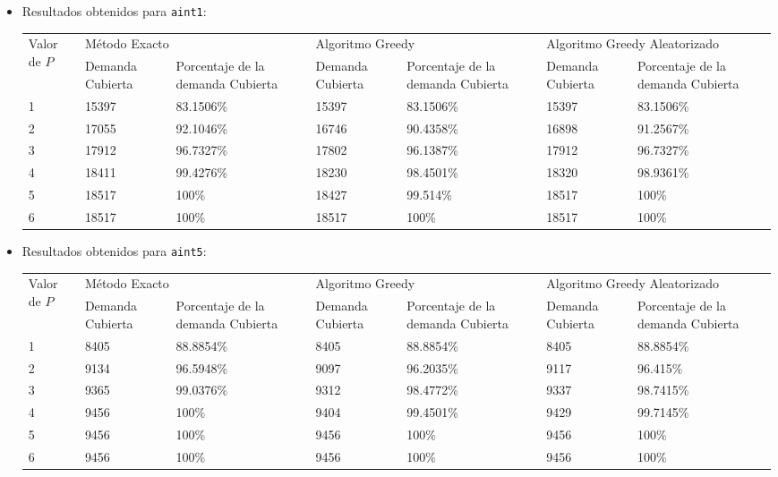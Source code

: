 \documentclass[a4paper,11pt]{article}
\begin{document}
\begin{itemize}
\item Resultados obtenidos para \texttt{aint1}:

\begin{table}[!htbp]
\label{results_aint1}
\centering
\begin{tabularx}{\textwidth}{|p{1.5cm}|p{1.5cm}|p{2cm}|p{1.5cm}|p{2cm}|p{1.5cm}|p{2cm}|}
\hline
\multirow{2}{\hsize}{Valor de ${P}$}	& \multicolumn{2}{X|}{Método Exacto}	& \multicolumn{2}{X|}{Algoritmo Greedy}	& \multicolumn{2}{X|}{Algoritmo Greedy Aleatorizado} \\ \cline{2-7}
& Demanda Cubierta  & Porcentaje de la demanda Cubierta	& Demanda Cubierta  & Porcentaje de la demanda Cubierta	& Demanda Cubierta  & Porcentaje de la demanda Cubierta	\\ \hline
1	& 15397	& 83.1506\%	& 15397	& 83.1506\%	& 15397	& 83.1506\%	\\ \hline
2	& 17055	& 92.1046\%	& 16746	& 90.4358\%	& 16898	& 91.2567\%	\\ \hline
3	& 17912	& 96.7327\%	& 17802	& 96.1387\%	& 17912	& 96.7327\%	\\ \hline
4	& 18411	& 99.4276\%	& 18230	& 98.4501\%	& 18320	& 98.9361\%	\\ \hline
5	& 18517	& 100\%		& 18427	& 99.514\%	& 18517	& 100\%		\\ \hline
6	& 18517	& 100\%		& 18517	& 100\%		& 18517	& 100\%		\\ \hline
\end{tabularx}
\end{table}

\item Resultados obtenidos para \texttt{aint5}:

\begin{table}[!htbp]
\label{results_aint5}
\centering
\begin{tabularx}{\textwidth}{|p{1.5cm}|p{1.5cm}|p{2cm}|p{1.5cm}|p{2cm}|p{1.5cm}|p{2cm}|}
\hline
\multirow{2}{\hsize}{Valor de ${P}$}	& \multicolumn{2}{X|}{Método Exacto}	& \multicolumn{2}{X|}{Algoritmo Greedy}	& \multicolumn{2}{X|}{Algoritmo Greedy Aleatorizado} \\ \cline{2-7}
& Demanda Cubierta  & Porcentaje de la demanda Cubierta	& Demanda Cubierta  & Porcentaje de la demanda Cubierta	& Demanda Cubierta  & Porcentaje de la demanda Cubierta	\\ \hline
1	& 8405	& 88.8854\%	& 8405	& 88.8854\%	& 8405	& 88.8854\%	\\ \hline
2	& 9134	& 96.5948\%	& 9097	& 96.2035\%	& 9117	& 96.415\%	\\ \hline
3	& 9365	& 99.0376\%	& 9312	& 98.4772\%	& 9337	& 98.7415\%	\\ \hline
4	& 9456	& 100\%		& 9404	& 99.4501\%	& 9429	& 99.7145\%	\\ \hline
5	& 9456	& 100\%		& 9456	& 100\%		& 9456	& 100\%		\\ \hline
6	& 9456	& 100\%		& 9456	& 100\%		& 9456	& 100\%		\\ \hline
\end{tabularx}
\end{table}

\end{itemize}
\end{document}
